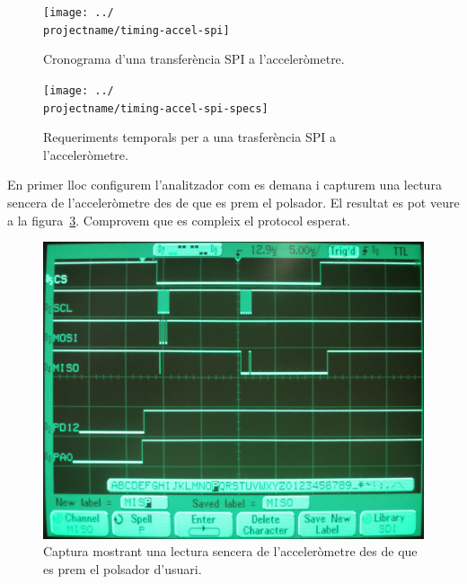 \begin{figure}
  \begin{center}
    \texttt{[image: ../\\projectname/timing-accel-spi]}
  \end{center}
  \caption{ \label{fig:p4-timing-accel} Cronograma d'una transferència SPI a l'acceleròmetre. }
\end{figure}

\begin{figure}
  \begin{center}
    \texttt{[image: ../\\projectname/timing-accel-spi-specs]}
  \end{center}
  \caption{ \label{fig:p4-timing-accel-specs} Requeriments temporals per a una trasferència SPI a l'acceleròmetre. }
\end{figure}

En primer lloc configurem l'analitzador com es demana i capturem una lectura sencera de
l'acceleròmetre des de que es prem el polsador.
El resultat es pot veure a la figura~\ref{fig:p4-analyzer-overview}.
Comprovem que es compleix el protocol esperat.

\begin{figure}
  \begin{center}
    \includegraphics[width=1\columnwidth]{../photos/analyzer/interrupt-overview}
  \end{center}
  \caption{ \label{fig:p4-analyzer-overview} Captura mostrant una lectura sencera de l'acceleròmetre des de que es prem el polsador d'usuari. }
\end{figure}


